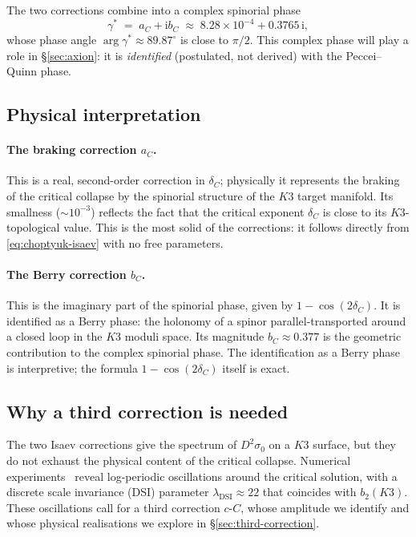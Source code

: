 \documentclass[11pt,a4paper]{article}
\newcommand{\dC}{\delta_C}
\newcommand{\cC}{c\text{-}C}
\providecommand{\ii}{}
\renewcommand{\ii}{\mathrm{i}}
\theoremstyle{plain}
\theoremstyle{definition}
\theoremstyle{remark}
\begin{document}
The two corrections combine into a complex spinorial phase
\begin{equation}\label{eq:gamma-star}
  \gamma^\ast \;=\; a_C + \ii b_C
             \;\approx\; 8.28\times 10^{-4} + 0.3765\,\ii,
\end{equation}
whose phase angle $\arg\gamma^\ast \approx 89.87^\circ$ is close to
$\pi/2$.  This complex phase will play a role in
\S\ref{sec:axion}: it is \emph{identified} (postulated, not derived)
with the Peccei--Quinn phase.

\subsection{Physical interpretation}

\paragraph{The braking correction $a_C$.}  This is a real, second-order
correction in $\dC$; physically it represents the braking of the
critical collapse by the spinorial structure of the $K3$ target
manifold.  Its smallness ($\sim 10^{-3}$) reflects the fact that the
critical exponent $\dC$ is close to its $K3$-topological value.  This
is the most solid of the corrections: it follows directly from
\eqref{eq:choptyuk-isaev} with no free parameters.

\paragraph{The Berry correction $b_C$.}  This is the imaginary part of
the spinorial phase, given by $1 - \cos(2\dC)$.  It is identified as a
Berry phase: the holonomy of a spinor parallel-transported around a
closed loop in the $K3$ moduli space.  Its magnitude $b_C \approx
0.377$ is the geometric contribution to the complex spinorial phase.
The identification as a Berry phase is interpretive; the formula
$1 - \cos(2\dC)$ itself is exact.

\subsection{Why a third correction is needed}

The two Isaev corrections give the spectrum of $D^2\sigma_0$ on a
$K3$ surface, but they do not exhaust the physical content of the
critical collapse.  Numerical experiments~\cite{choptyuk1993,
gundlach1999} reveal log-periodic oscillations around the critical
solution, with a discrete scale invariance (DSI) parameter
$\lambda_{\mathrm{DSI}} \approx 22$ that coincides with $b_2(K3)$.
These oscillations call for a third correction $\cC$, whose amplitude
we identify and whose physical realisations we explore in
\S\ref{sec:third-correction}.
\end{document}
